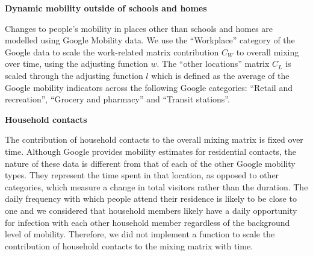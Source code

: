 \vspace{5pt}
\textbf{Dynamic mobility outside of schools and homes}

Changes to people's mobility in places other than schools and homes are modelled using Google Mobility data. We use the ``Workplace''
category of the Google data to scale the work-related matrix contribution $C_W$ to overall mixing over time, using the adjusting function
$w$. The ``other locations'' matrix $C_L$ is scaled through the adjusting function $l$ which is defined as the average of the Google mobility
indicators across the following Google categories: ``Retail and recreation'', ``Grocery and pharmacy'' and ``Transit stations''.

\vspace{5pt}
\textbf{Household contacts}

The contribution of household contacts to the overall mixing matrix is fixed over time. Although Google provides mobility 
estimates for residential contacts, the nature of these data is different from that of each of the other Google mobility 
types. They represent the time spent in that location, as opposed to other categories, which measure a change in total visitors 
rather than the duration. The daily frequency with which people attend their residence is likely to be close to one and we 
considered that household members likely have a daily opportunity for infection with each other household member regardless of
the background level of mobility. Therefore, we did not implement a function to scale the contribution of household contacts 
to the mixing matrix with time.

